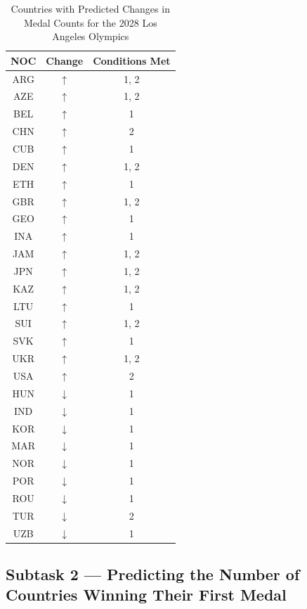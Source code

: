 \documentclass{mcmthesis}
\begin{document}
\begin{table}[htbp]
    \centering
    \begin{tabular}{|c|c|c|}
        \hline
        NOC & Change & Conditions Met \\
        \hline
        ARG & $\uparrow$ & 1, 2 \\
        AZE & $\uparrow$ & 1, 2 \\
        BEL & $\uparrow$ & 1 \\
        CHN & $\uparrow$ & 2 \\
        CUB & $\uparrow$ & 1 \\
        DEN & $\uparrow$ & 1, 2 \\
        ETH & $\uparrow$ & 1 \\
        GBR & $\uparrow$ & 1, 2 \\
        GEO & $\uparrow$ & 1 \\
        INA & $\uparrow$ & 1 \\
        JAM & $\uparrow$ & 1, 2 \\
        JPN & $\uparrow$ & 1, 2 \\
        KAZ & $\uparrow$ & 1, 2 \\
        LTU & $\uparrow$ & 1 \\
        SUI & $\uparrow$ & 1, 2 \\
        SVK & $\uparrow$ & 1 \\
        UKR & $\uparrow$ & 1, 2 \\
        USA & $\uparrow$ & 2 \\
        HUN & $\downarrow$ & 1 \\
        IND & $\downarrow$ & 1 \\
        KOR & $\downarrow$ & 1 \\
        MAR & $\downarrow$ & 1 \\
        NOR & $\downarrow$ & 1 \\
        POR & $\downarrow$ & 1 \\
        ROU & $\downarrow$ & 1 \\
        TUR & $\downarrow$ & 2 \\
        UZB & $\downarrow$ & 1 \\
        \hline
    \end{tabular}
    \caption{Countries with Predicted Changes in Medal Counts for the 2028 Los Angeles Olympics}
    \label{tab:medal_changes}
\end{table}

\subsection{Subtask 2 --- Predicting the Number of Countries Winning Their First Medal}
\end{document}

